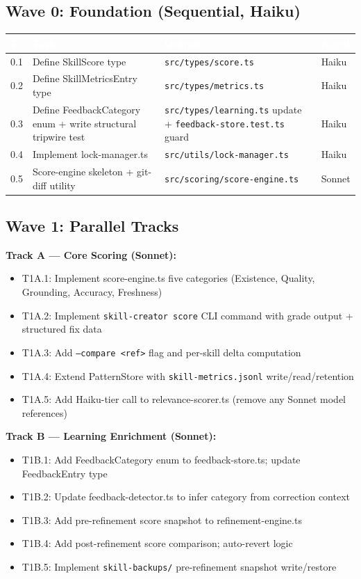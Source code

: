 \documentclass[11pt,letterpaper]{article}
\newcommand{\tableheader}[1]{\textbf{\sffamily\textcolor{white}{#1}}}
\begin{document}
\subsection{Wave 0: Foundation (Sequential, Haiku)}

\begin{center}
\begin{tabularx}{\textwidth}{C{0.5cm}L{4cm}L{4.5cm}C{2cm}}
\toprule
{}
\tableheader{T} & \tableheader{Task} & \tableheader{Output} & \tableheader{Agent} \\
 & Define SkillScore type & \texttt{src/types/score.ts} & Haiku \\
0.2 & Define SkillMetricsEntry type & \texttt{src/types/metrics.ts} & Haiku \\
0.3 & Define FeedbackCategory enum + write structural tripwire test & \texttt{src/types/learning.ts} update + \texttt{feedback-store.test.ts} guard & Haiku \\
0.4 & Implement lock-manager.ts & \texttt{src/utils/lock-manager.ts} & Haiku \\
0.5 & Score-engine skeleton + git-diff utility & \texttt{src/scoring/score-engine.ts} & Sonnet \\
\bottomrule
\end{tabularx}
\end{center}

\subsection{Wave 1: Parallel Tracks}

\textbf{Track A — Core Scoring (Sonnet):}
\begin{itemize}[leftmargin=1.5em]
  \item T1A.1: Implement score-engine.ts five categories (Existence, Quality, Grounding, Accuracy, Freshness)
  \item T1A.2: Implement \texttt{skill-creator score} CLI command with grade output + structured fix data
  \item T1A.3: Add \texttt{--compare <ref>} flag and per-skill delta computation
  \item T1A.4: Extend PatternStore with \texttt{skill-metrics.jsonl} write/read/retention
  \item T1A.5: Add Haiku-tier call to relevance-scorer.ts (remove any Sonnet model references)
\end{itemize}

\textbf{Track B — Learning Enrichment (Sonnet):}
\begin{itemize}[leftmargin=1.5em]
  \item T1B.1: Add FeedbackCategory enum to feedback-store.ts; update FeedbackEntry type
  \item T1B.2: Update feedback-detector.ts to infer category from correction context
  \item T1B.3: Add pre-refinement score snapshot to refinement-engine.ts
  \item T1B.4: Add post-refinement score comparison; auto-revert logic
  \item T1B.5: Implement \texttt{skill-backups/} pre-refinement snapshot write/restore
\end{itemize}
\end{document}
